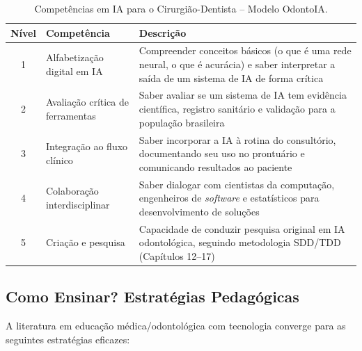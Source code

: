 \begin{table}[H]
  \centering
  \caption{Competências em IA para o Cirurgião-Dentista -- Modelo OdontoIA.}
  \label{tab:competencias-ia}
  \begin{tabularx}{\textwidth}{clX}
    \toprule
    \textbf{Nível} & \textbf{Competência} & \textbf{Descrição} \\
    \midrule
    1 & Alfabetização digital em IA & Compreender conceitos básicos (o que é
      uma rede neural, o que é acurácia) e saber interpretar a saída de um
      sistema de IA de forma crítica \\
    2 & Avaliação crítica de ferramentas & Saber avaliar se um sistema de IA
      tem evidência científica, registro sanitário e validação para a população
      brasileira \\
    3 & Integração ao fluxo clínico & Saber incorporar a IA à rotina do
      consultório, documentando seu uso no prontuário e comunicando resultados
      ao paciente \\
    4 & Colaboração interdisciplinar & Saber dialogar com cientistas da
      computação, engenheiros de \textit{software} e estatísticos para
      desenvolvimento de soluções \\
    5 & Criação e pesquisa & Capacidade de conduzir pesquisa original em IA
      odontológica, seguindo metodologia SDD/TDD (Capítulos 12--17) \\
    \bottomrule
  \end{tabularx}
\end{table}


\subsection{Como Ensinar? Estratégias Pedagógicas}

A literatura em educação médica/odontológica com tecnologia converge para as
seguintes estratégias eficazes:

